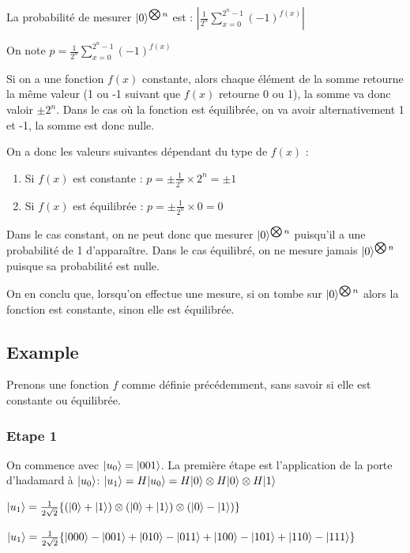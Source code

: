 \documentclass[12pt,a4paper]{article}
\DeclarePairedDelimiter\ket{\lvert}{\rangle}
\begin{document}
La probabilité de mesurer $\ket{0}^{\bigotimes n}$ est : 
$|\frac{1}{2^{n}}\displaystyle\sum_{x=0}^{2^n-1}(-1)^{f(x)}|$

On note $p = \frac{1}{2^{n}}\displaystyle\sum_{x=0}^{2^n-1}(-1)^{f(x)}$

Si on a une fonction $f(x)$ constante, alors chaque élément de la somme retourne la même valeur (1 ou -1 suivant que $f(x)$ retourne 0 ou 1), la somme va donc valoir $\pm 2^{n}$. Dans le cas où la fonction est équilibrée, on va avoir alternativement 1 et -1, la somme est donc nulle.

On a donc les valeurs suivantes dépendant du type de $f(x)$ :
\begin{enumerate}
  \item Si $f(x)$ est constante :  $p = \pm \frac{1}{2^n} \times 2^{n} = \pm 1$
  \item Si $f(x)$ est équilibrée : $p = \pm \frac{1}{2^n} \times 0 = 0$
\end{enumerate}

Dans le cas constant, on ne peut donc que mesurer $\ket{0}^{\bigotimes n}$ puisqu'il a une probabilité de 1 d'apparaître. Dans le cas équilibré, on ne mesure jamais $\ket{0}^{\bigotimes n}$ puisque sa probabilité est nulle.

On en conclu que, lorsqu'on effectue une mesure, si on tombe sur $\ket{0}^{\bigotimes n}$ alors la fonction est constante, sinon elle est équilibrée.

\subsection{Example}

Prenons une fonction $f$ comme définie précédemment, sans savoir si elle est constante ou équilibrée.

\subsubsection{Etape 1}

On commence avec $\ket{u_0} = \ket{001}$. La première étape est l'application de la porte d'hadamard à $\ket{u_0}$: 
\medbreak
$
\ket{u_1} = H\ket{u_0} = H\ket{0} \otimes H\ket{0} \otimes H\ket{1}
$

$
\ket{u_1} = \frac{1}{2\sqrt{2}}\{ (\ket{0} + \ket{1})\otimes(\ket{0} + \ket{1})\otimes(\ket{0} - \ket{1}) \}
$

$
\ket{u_1} = \frac{1}{2\sqrt{2}}\{\ket{000} - \ket{001} + \ket{010} - \ket{011} + \ket{100} - \ket{101} + \ket{110} - \ket{111}\}
$
\end{document}
